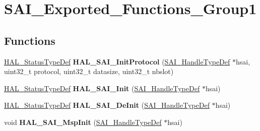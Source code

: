 \hypertarget{group___s_a_i___exported___functions___group1}{}\section{S\+A\+I\+\_\+\+Exported\+\_\+\+Functions\+\_\+\+Group1}
\label{group___s_a_i___exported___functions___group1}
\subsection*{Functions}
\begin{DoxyCompactItemize}
\item 
\hyperlink{stm32f4xx__hal__def_8h_a63c0679d1cb8b8c684fbb0632743478f}{H\+A\+L\+\_\+\+Status\+Type\+Def} {\bfseries H\+A\+L\+\_\+\+S\+A\+I\+\_\+\+Init\+Protocol} (\hyperlink{group___s_a_i___exported___types_gaf45214e5c90f73800130b3945bf45144}{S\+A\+I\+\_\+\+Handle\+Type\+Def} $\ast$hsai, uint32\+\_\+t protocol, uint32\+\_\+t datasize, uint32\+\_\+t nbslot)\hypertarget{group___s_a_i___exported___functions___group1_ga1da223c65cec409fb1cebb06cc33ce2d}{}\label{group___s_a_i___exported___functions___group1_ga1da223c65cec409fb1cebb06cc33ce2d}

\item 
\hyperlink{stm32f4xx__hal__def_8h_a63c0679d1cb8b8c684fbb0632743478f}{H\+A\+L\+\_\+\+Status\+Type\+Def} {\bfseries H\+A\+L\+\_\+\+S\+A\+I\+\_\+\+Init} (\hyperlink{group___s_a_i___exported___types_gaf45214e5c90f73800130b3945bf45144}{S\+A\+I\+\_\+\+Handle\+Type\+Def} $\ast$hsai)\hypertarget{group___s_a_i___exported___functions___group1_gab35070be65322c860ddfca04ff5dc8cb}{}\label{group___s_a_i___exported___functions___group1_gab35070be65322c860ddfca04ff5dc8cb}

\item 
\hyperlink{stm32f4xx__hal__def_8h_a63c0679d1cb8b8c684fbb0632743478f}{H\+A\+L\+\_\+\+Status\+Type\+Def} {\bfseries H\+A\+L\+\_\+\+S\+A\+I\+\_\+\+De\+Init} (\hyperlink{group___s_a_i___exported___types_gaf45214e5c90f73800130b3945bf45144}{S\+A\+I\+\_\+\+Handle\+Type\+Def} $\ast$hsai)\hypertarget{group___s_a_i___exported___functions___group1_gae7028c570d2c9b64cb152d5a5bdb9f70}{}\label{group___s_a_i___exported___functions___group1_gae7028c570d2c9b64cb152d5a5bdb9f70}

\item 
void {\bfseries H\+A\+L\+\_\+\+S\+A\+I\+\_\+\+Msp\+Init} (\hyperlink{group___s_a_i___exported___types_gaf45214e5c90f73800130b3945bf45144}{S\+A\+I\+\_\+\+Handle\+Type\+Def} $\ast$hsai)\hypertarget{group___s_a_i___exported___functions___group1_gae6196683176c27592bf706a813105ad4}{}\label{group___s_a_i___exported___functions___group1_gae6196683176c27592bf706a813105ad4}


\end{DoxyCompactItemize}
